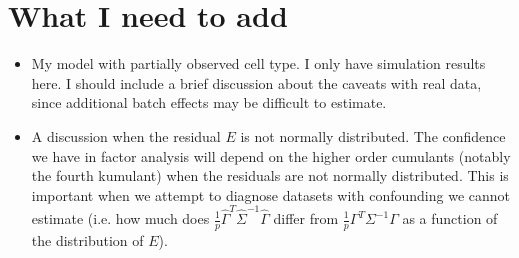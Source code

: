 \documentclass{article}
\begin{document}
\section{What I need to add}
\begin{itemize}
\item My model with partially observed cell type. I only have simulation results here. I should include a brief discussion about the caveats with real data, since additional batch effects may be difficult to estimate.
\item A discussion when the residual $E$ is not normally distributed. The confidence we have in factor analysis will depend on the higher order cumulants (notably the fourth kumulant) when the residuals are not normally distributed. This is important when we attempt to diagnose datasets with confounding we cannot estimate (i.e. how much does $\frac{1}{p}\hat{\Gamma}^T\hat{\Sigma}^{-1}\hat{\Gamma}$ differ from $\frac{1}{p}\Gamma^T \Sigma^{-1}\Gamma$ as a function of the distribution of $E$).
\end{itemize}
\end{document}
